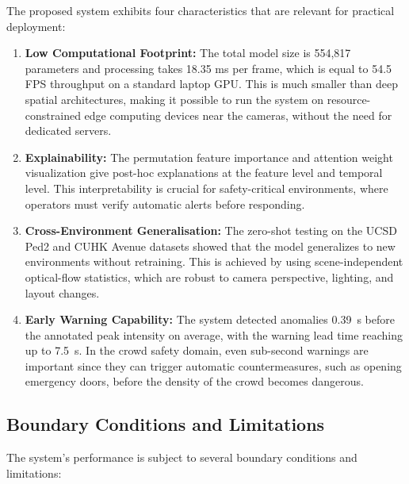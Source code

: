 The proposed system exhibits four characteristics that are relevant for practical deployment:

\begin{enumerate}
  \item \textbf{Low Computational Footprint:} The total model size is 554,817 parameters and processing takes 18.35 ms per frame, which is equal to 54.5 FPS throughput on a standard laptop GPU. This is much smaller than deep spatial architectures, making it possible to run the system on resource-constrained edge computing devices near the cameras, without the need for dedicated servers.
  \item \textbf{Explainability:} The permutation feature importance and attention weight visualization give post-hoc explanations at the feature level and temporal level. This interpretability is crucial for safety-critical environments, where operators must verify automatic alerts before responding.
  \item \textbf{Cross-Environment Generalisation:} The zero-shot testing on the UCSD Ped2 and CUHK Avenue datasets showed that the model generalizes to new environments without retraining. This is achieved by using scene-independent optical-flow statistics, which are robust to camera perspective, lighting, and layout changes.
  \item \textbf{Early Warning Capability:} The system detected anomalies 0.39~s before the annotated peak intensity on average, with the warning lead time reaching up to 7.5~s. In the crowd safety domain, even sub-second warnings are important since they can trigger automatic countermeasures, such as opening emergency doors, before the density of the crowd becomes dangerous.
\end{enumerate}

\subsection{Boundary Conditions and Limitations}

The system's performance is subject to several boundary conditions and limitations:

